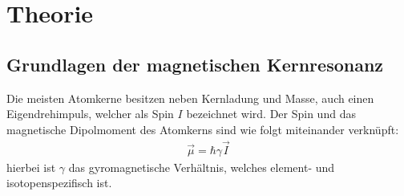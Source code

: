 \section{Theorie}
\label{sec:Theorie}
\subsection{Grundlagen der magnetischen Kernresonanz}
\label{sec:grundlagen}
Die meisten Atomkerne besitzen neben Kernladung und Masse, auch einen Eigendrehimpuls, welcher als Spin $I$ bezeichnet wird.
Der Spin und das magnetische Dipolmoment des Atomkerns sind wie folgt miteinander verkn\"{u}pft:
\begin{align*}
	\overrightarrow{\mu} = \hbar \gamma \overrightarrow{I}
\end{align*}
hierbei ist $\gamma$ das gyromagnetische Verh\"{a}ltnis, welches element- und isotopenspezifisch ist.

